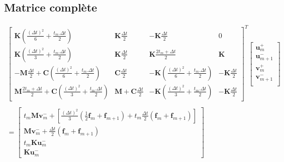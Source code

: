 \documentclass[12pt,a4paper]{report}
\begin{document}
\subsection{Matrice complète}
\begin{equation}
\!\!\!\!\!\!\!\!\!\!\!\!\!\!\!\!\!\!\!\!\!\!\!\!\!\!\!\!\!\!\!\!\!\!\!
\begin{array}{l }
	\begin{bmatrix}	   
		   \mathbf{K}
			   \left( \frac{(\Delta t)^2}{6} + \frac{t_m.\Delta t}{2}
			   \right)
			&
		   \mathbf{K} \frac{\Delta t}{2}
		   &   
		   - \mathbf{K} \frac{\Delta t}{2} 
			&
		   0
		\\   
		   \mathbf{K}
			   \left( \frac{(\Delta t)^2}{3} + \frac{t_m.\Delta t}{2}
			   \right)
			&
		   \mathbf{K} \frac{\Delta t}{2} 
		   &
		   \mathbf{K}
			   		\frac{2t_m + \Delta t}{2} 
			&
		   \mathbf{K}
		\\   
		   -\mathbf{M}
		   		\frac{\Delta t}{2} 
		   +\mathbf{C}
		   		\left( \frac{(\Delta t)^2}{6} + \frac{t_m.\Delta t}{2} \right)  
		   & 
		    \mathbf{C} \frac{\Delta t}{2}
		   &
		   -\mathbf{K}
		   		(\frac{(\Delta t)^2}{6} + \frac{t_m.\Delta t}{2})
		   &
		   -\mathbf{K} \frac{\Delta t}{2}
		\\   
		   \mathbf{M}
		   		\frac{2t_m + \Delta t}{2} 
		   +\mathbf{C}
		   		\left( \frac{(\Delta t)^2}{3} + \frac{t_m.\Delta t}{2}\right)
		   &
		   \mathbf{M} 
		   +\mathbf{C} \frac{\Delta t}{2}
		   &
		   -\mathbf{K}
		   		(\frac{(\Delta t)^2}{3} + \frac{t_m.\Delta t}{2})
		   		&
		   -\mathbf{K} \frac{\Delta t}{2}
	\end{bmatrix}^T
	\begin{bmatrix}
		   \mathbf{u}_m^+  		\\
		   \mathbf{u}_{m+1}^-  	\\
		   \mathbf{v}_m^+  		\\
		   \mathbf{v}_{m+1}^-  	\\
	\end{bmatrix}
	\\
	\\
		= 
		\begin{bmatrix}
	   t_m \mathbf{M} \mathbf{v}_m^-
	   + \left[
			\frac{(\Delta t)^2}{3}
				\left( \frac{1}{2} \mathbf{f}_m + \mathbf{f}_{m+1} \right)
			+t_m \frac{\Delta t}{2} (\mathbf{f}_m + \mathbf{f}_{m+1}) 
		\right]
	\\
		\mathbf{M} \mathbf{v}_m^-
		     +\frac{\Delta t}{2}  (\mathbf{f}_m + \mathbf{f}_{m+1})
	\\
		t_m \mathbf{K} \mathbf{u}_m^-
	\\
		\mathbf{K} \mathbf{u}_m^-
	\end{bmatrix}	
\end{array}
\end{equation}
\end{document}
